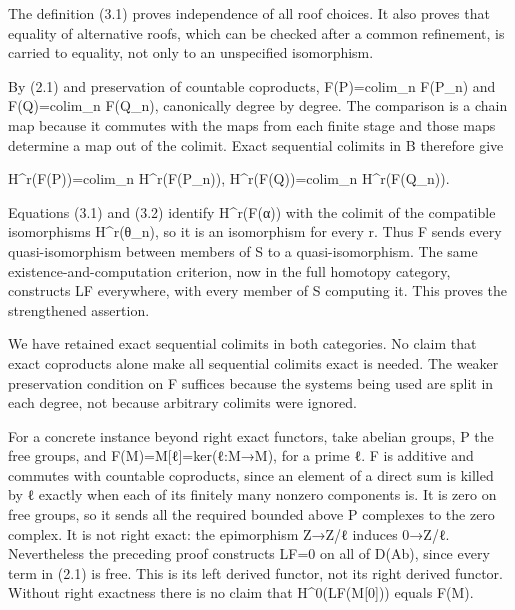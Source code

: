 The definition (3.1)\allowbreak{} proves independence of all roof choices. It also proves that equality of alternative roofs,\allowbreak{} which can be checked after a common refinement,\allowbreak{} is carried to equality,\allowbreak{} not only to an unspecified isomorphism.

By (2.1)\allowbreak{} and preservation of countable coproducts,\allowbreak{} F(P)\allowbreak{}\allowbreak{}=colim\_\allowbreak{}n F(P\_\allowbreak{}n)\allowbreak{} and F(Q)\allowbreak{}\allowbreak{}=colim\_\allowbreak{}n F(Q\_\allowbreak{}n)\allowbreak{},\allowbreak{} canonically degree by degree. The comparison is a chain map because it commutes with the maps from each finite stage and those maps determine a map out of the colimit. Exact sequential colimits in B therefore give

H\textasciicircum{}r(F(P)\allowbreak{})\allowbreak{}\allowbreak{}=colim\_\allowbreak{}n H\textasciicircum{}r(F(P\_\allowbreak{}n)\allowbreak{})\allowbreak{},\allowbreak{} H\textasciicircum{}r(F(Q)\allowbreak{})\allowbreak{}\allowbreak{}=colim\_\allowbreak{}n H\textasciicircum{}r(F(Q\_\allowbreak{}n)\allowbreak{})\allowbreak{}.

Equations (3.1)\allowbreak{} and (3.2)\allowbreak{} identify H\textasciicircum{}r(F(α)\allowbreak{})\allowbreak{} with the colimit of the compatible isomorphisms H\textasciicircum{}r(θ\_\allowbreak{}n)\allowbreak{},\allowbreak{} so it is an isomorphism for every r. Thus F sends every quasi-isomorphism between members of S to a quasi-isomorphism. The same existence-and-computation criterion,\allowbreak{} now in the full homotopy category,\allowbreak{} constructs LF everywhere,\allowbreak{} with every member of S computing it. This proves the strengthened assertion.

We have retained exact sequential colimits in both categories. No claim that exact coproducts alone make all sequential colimits exact is needed. The weaker preservation condition on F suffices because the systems being used are split in each degree,\allowbreak{} not because arbitrary colimits were ignored.

For a concrete instance beyond right exact functors,\allowbreak{} take abelian groups,\allowbreak{} P the free groups,\allowbreak{} and F(M)\allowbreak{}\allowbreak{}=M[ℓ]\allowbreak{}\allowbreak{}=ker(ℓ:\allowbreak{}M\allowbreak{}→M)\allowbreak{},\allowbreak{} for a prime ℓ. F is additive and commutes with countable coproducts,\allowbreak{} since an element of a direct sum is killed by ℓ exactly when each of its finitely many nonzero components is. It is zero on free groups,\allowbreak{} so it sends all the required bounded above P complexes to the zero complex. It is not right exact:\allowbreak{} the epimorphism Z\allowbreak{}→Z/\allowbreak{}ℓ induces 0\allowbreak{}→Z/\allowbreak{}ℓ. Nevertheless the preceding proof constructs LF\allowbreak{}=0 on all of D(Ab)\allowbreak{},\allowbreak{} since every term in (2.1)\allowbreak{} is free. This is its left derived functor,\allowbreak{} not its right derived functor. Without right exactness there is no claim that H\textasciicircum{}0(LF(M[0]\allowbreak{})\allowbreak{})\allowbreak{} equals F(M)\allowbreak{}.

